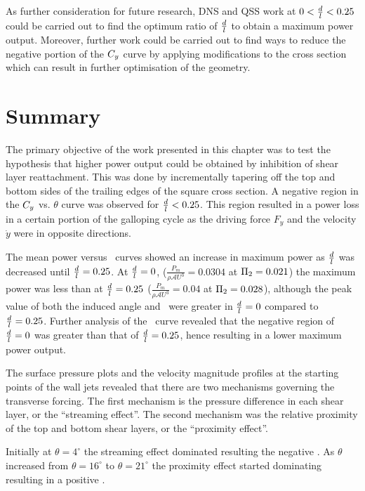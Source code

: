   As further consideration for future research, DNS and QSS work at $0<\frac{d}{l}<0.25$ could be carried out to find the optimum ratio of $\frac{d}{l}$ to obtain a maximum power output. Moreover, further work could be carried out to find ways to reduce the negative portion of the $C_{y}$ curve by applying modifications to the cross section which can result in further optimisation of the geometry.
 
 \section{Summary} 
 \label{sec:summary-diff-cross-sec}
 
 The primary objective of the work presented in this chapter was to test the hypothesis that higher power output could be obtained by inhibition of shear layer reattachment. This was done by incrementally tapering off the top and bottom sides of the trailing edges of the square cross section. A negative region in the $C_{y}$ vs. $\theta$ curve was observed for $\frac{d}{l}<0.25$. This region resulted in a power loss in a certain portion of the galloping cycle as the driving force $F_y$ and the velocity $\dot{y}$ were in opposite directions.
 
 The mean power versus \massdamp\ curves showed an increase in maximum power as $\frac{d}{l}$ was decreased until $\frac{d}{l}=0.25$. At $\frac{d}{l}=0$,  ($\displaystyle\frac{P_{m}}{\rho \mathcal{A}U^3}=0.0304$ at $\Pi_2=0.021$) the maximum power was less than at $\frac{d}{l}=0.25$ ($\displaystyle\frac{P_{m}}{\rho \mathcal{A}U^3}=0.04$ at $\Pi_2=0.028$), although the peak value of both the induced angle and \cy\ were greater in $\frac{d}{l}=0$ compared to $\frac{d}{l}=0.25$. Further analysis of the \cy\ curve revealed that the negative region of $\frac{d}{l}=0$  was greater than that of $\frac{d}{l}=0.25$, hence resulting in a lower maximum power output. 
 
 The surface pressure plots and the velocity magnitude profiles at the starting points of the wall jets revealed  that there are two mechanisms governing the transverse forcing. The first mechanism is the pressure difference in each shear layer, or the ``streaming effect''. The second mechanism was the relative proximity of the top and bottom shear layers, or the ``proximity effect''.

 Initially at $\theta= 4^{\circ}$ the streaming effect dominated resulting the negative \cy. As $\theta$ increased from  $\theta= 16^{\circ}$ to  $\theta= 21^{\circ}$ the proximity effect started dominating resulting in a positive \cy.
 
